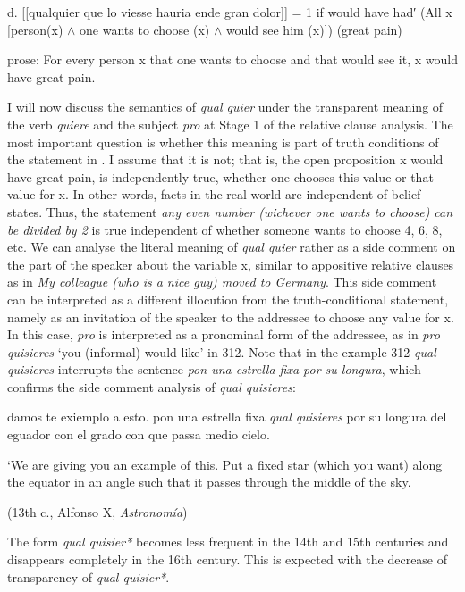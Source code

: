 \documentclass[output=paper]{langscibook}
\begin{document}
  d.  [[qualquier que lo viesse hauria ende gran dolor]] = 1 if would have had′ (All x [person(x) ${\wedge}$ one wants to choose (x) ${\wedge}$ would see him (x)]) (great pain)  

    prose: For every person x that one wants to choose and that would see it, x would have great pain.

I will now discuss the semantics of \textit{qual quier} under the transparent meaning of the verb \textit{quiere} and the subject \textit{pro} at Stage 1 of the relative clause analysis. The most important question is whether this meaning is part of truth conditions of the statement in . I assume that it is not; that is, the open proposition x would have great pain, is independently true, whether one chooses this value or that value for x. In other words, facts in the real world are independent of belief states. Thus, the statement \textit{any even number (wichever one wants to choose) can be divided by 2} is true independent of whether someone wants to choose 4, 6, 8, etc. We can analyse the literal meaning of \textit{qual quier} rather as a side comment on the part of the speaker about the variable x, similar to appositive relative clauses as in \textit{My colleague (who is a nice guy) moved to Germany}. This side comment can be interpreted as a different illocution from the truth-conditional statement, namely as an invitation of the speaker to the addressee to choose any value for x. In this case, \textit{pro} is interpreted as a pronominal form of the addressee, as in \textit{pro} \textit{quisieres} ‘you (informal) would like’ in 312. Note that in the example 312 \textit{qual quisieres} interrupts the sentence \textit{pon una estrella fixa por su longura}, which confirms the side comment analysis of \textit{qual quisieres}: 

  damos te exiemplo a esto. pon una estrella fixa \textit{qual quisieres} por su longura del eguador con el grado con que passa medio cielo.

  ‘We are giving you an example of this. Put a fixed star (which you want) along the equator in an angle such that it passes through the middle of the sky. 

\begin{styleListParagraph}
\textmd{  (13th c., Alfonso X,} \textmd{\textit{Astronomía}}\textmd{)}
\end{styleListParagraph}

The form \textit{qual quisier*} becomes less frequent in the 14th and 15th centuries and disappears completely in the 16th century. This is expected with the decrease of transparency of \textit{qual quisier*}. 
\end{document}
